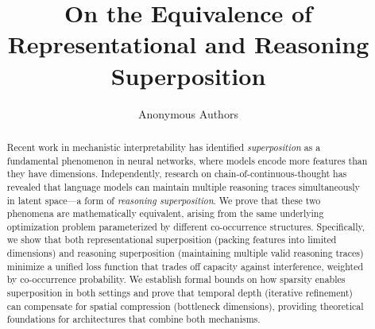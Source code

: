 \documentclass[10pt]{article}
\title{On the Equivalence of Representational and Reasoning Superposition}
\author{
  Anonymous Authors
}
\begin{document}
\maketitle

\begin{abstract}
Recent work in mechanistic interpretability has identified \emph{superposition} as a fundamental phenomenon in neural networks, where models encode more features than they have dimensions. Independently, research on chain-of-continuous-thought has revealed that language models can maintain multiple reasoning traces simultaneously in latent space---a form of \emph{reasoning superposition}. We prove that these two phenomena are mathematically equivalent, arising from the same underlying optimization problem parameterized by different co-occurrence structures. Specifically, we show that both representational superposition (packing features into limited dimensions) and reasoning superposition (maintaining multiple valid reasoning traces) minimize a unified loss function that trades off capacity against interference, weighted by co-occurrence probability. We establish formal bounds on how sparsity enables superposition in both settings and prove that temporal depth (iterative refinement) can compensate for spatial compression (bottleneck dimensions), providing theoretical foundations for architectures that combine both mechanisms.
\end{abstract}











\appendix

\end{document}
